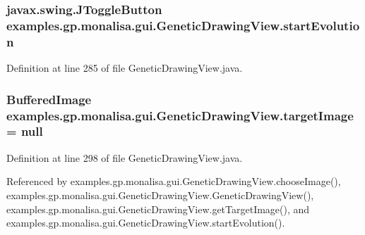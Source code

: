 \hypertarget{classexamples_1_1gp_1_1monalisa_1_1gui_1_1_genetic_drawing_view_a16ebb79b30bb7b61ea6b2356363acc77}{
\subsubsection[{start\-Evolution}]{\setlength{\rightskip}{0pt plus 5cm}javax.\-swing.\-J\-Toggle\-Button examples.\-gp.\-monalisa.\-gui.\-Genetic\-Drawing\-View.\-start\-Evolution\hspace{0.3cm}{\ttfamily [private]}}}\label{classexamples_1_1gp_1_1monalisa_1_1gui_1_1_genetic_drawing_view_a16ebb79b30bb7b61ea6b2356363acc77}


Definition at line 285 of file Genetic\-Drawing\-View.\-java.

\hypertarget{classexamples_1_1gp_1_1monalisa_1_1gui_1_1_genetic_drawing_view_aa47764eab76c8f6cdbb0a5a4479f6ee0}{
\subsubsection[{target\-Image}]{\setlength{\rightskip}{0pt plus 5cm}Buffered\-Image examples.\-gp.\-monalisa.\-gui.\-Genetic\-Drawing\-View.\-target\-Image = null\hspace{0.3cm}{\ttfamily [private]}}}\label{classexamples_1_1gp_1_1monalisa_1_1gui_1_1_genetic_drawing_view_aa47764eab76c8f6cdbb0a5a4479f6ee0}


Definition at line 298 of file Genetic\-Drawing\-View.\-java.



Referenced by examples.\-gp.\-monalisa.\-gui.\-Genetic\-Drawing\-View.\-choose\-Image(), examples.\-gp.\-monalisa.\-gui.\-Genetic\-Drawing\-View.\-Genetic\-Drawing\-View(), examples.\-gp.\-monalisa.\-gui.\-Genetic\-Drawing\-View.\-get\-Target\-Image(), and examples.\-gp.\-monalisa.\-gui.\-Genetic\-Drawing\-View.\-start\-Evolution().

